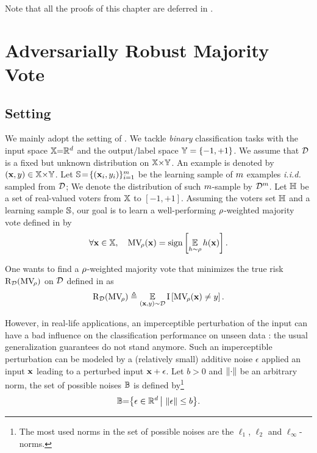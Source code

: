 Note that all the proofs of this chapter are deferred in .


\section{Adversarially Robust Majority Vote}
\label{chap:mv-robustness:section:adversarial-robust-pac-bayes}

\subsection{Setting}

We mainly adopt the setting of .
We tackle {\it binary} classification tasks with the input space $\X{=}\R^\d$ and the output/label space $\Y=\{-1,+1\}$.
We assume that $\D$ is a fixed but unknown distribution on $\X{\times}\Y$.
An example is denoted by $(\x,\y) \in\X{\times}\Y$.
Let $\S\!=\!\{(\x_i,\y_i)\}_{i=1}^{\m}$ be the learning sample of $\m$ examples {\it i.i.d.} sampled from $\D$; 
We denote the distribution of such $\m$-sample by $\D^\m$.
Let $\H$ be a set of real-valued voters from $\X$ to $[-1, +1]$.
Assuming the voters set $\H$ and a learning sample $\S$, our goal is to learn a well-performing $\Q$-weighted majority vote defined in  by
\begin{align*}
\forall \x\in\X,\quad \MVQ(\x) = \sign\LB \EE_{\h\sim \Q} \h(\x) \RB.
\end{align*}

One wants to find a $\Q$-weighted majority vote that minimizes the true risk $\Risk_{\D}(\MVQ)$ on $\D$ defined in  as
\begin{align*}
\Risk_{\D}(\MVQ) \triangleq \EE_{(\x, \y)\sim\D} \indic\LB \MVQ(\x) \ne \y\RB.
\end{align*}

However, in real-life applications, an imperceptible perturbation of the input can have a bad influence on the classification performance on unseen data \citep{SzegedyZarembaSutskeverBrunaErhanGoodfellowFergus2014}: the usual generalization guarantees do not stand anymore.
Such an imperceptible perturbation can be modeled by a (relatively small) additive noise $\epsilon$ applied an input $\x$ leading to a perturbed input $\x+\epsilon$.
Let $b\!>\!0$ and $\LM\cdot\RM$ be an arbitrary norm, the set of possible noises $\Xpert$ is defined by\footnote{The most used norms in the set of possible noises are the $\ell_1$, $\ell_2$ and $\ell_\infty$-norms.}
\begin{align*}
\Xpert{=}\big\{ \epsilon\in\R^\d  \,\big|\, \LM \epsilon\RM \le b\big\}.
\end{align*}

